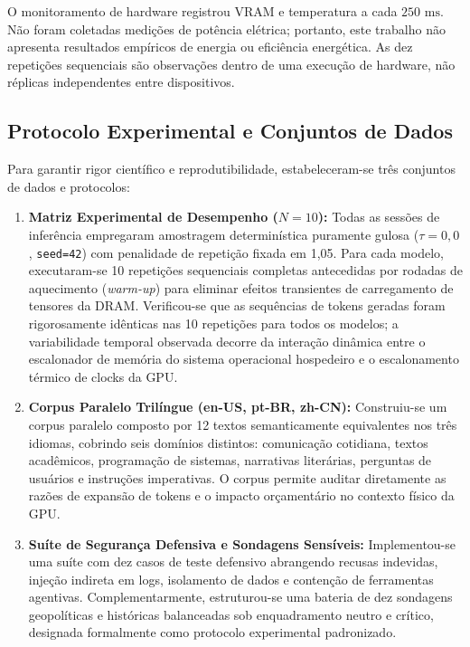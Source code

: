 \documentclass[10pt,a4paper,twocolumn]{article}
\begin{document}
O monitoramento de hardware registrou VRAM e temperatura a cada $250\text{ ms}$. N\~ao foram coletadas medi\c{c}\~oes de pot\^encia el\'etrica; portanto, este trabalho n\~ao apresenta resultados emp\'iricos de energia ou efici\^encia energ\'etica. As dez repeti\c{c}\~oes sequenciais s\~ao observa\c{c}\~oes dentro de uma execu\c{c}\~ao de hardware, n\~ao r\'eplicas independentes entre dispositivos.

\subsection{Protocolo Experimental e Conjuntos de Dados}

Para garantir rigor cient\'ifico e reprodutibilidade, estabeleceram-se tr\^es conjuntos de dados e protocolos:
\begin{enumerate}[leftmargin=1.5em,itemsep=0.2em]
    \item \textbf{Matriz Experimental de Desempenho ($N=10$):} Todas as sess\~oes de infer\^encia empregaram amostragem determin\'istica puramente gulosa ($\tau = 0,0$, \texttt{seed=42}) com penalidade de repeti\c{c}\~ao fixada em 1,05. Para cada modelo, executaram-se 10 repeti\c{c}\~oes sequenciais completas antecedidas por rodadas de aquecimento (\emph{warm-up}) para eliminar efeitos transientes de carregamento de tensores da DRAM. Verificou-se que as sequ\^encias de tokens geradas foram rigorosamente id\^enticas nas 10 repeti\c{c}\~oes para todos os modelos; a variabilidade temporal observada decorre da intera\c{c}\~ao din\^amica entre o escalonador de mem\'oria do sistema operacional hospedeiro e o escalonamento t\'ermico de clocks da GPU.
    \item \textbf{Corpus Paralelo Tril\'ingue (en-US, pt-BR, zh-CN):} Construiu-se um corpus paralelo composto por 12 textos semanticamente equivalentes nos tr\^es idiomas, cobrindo seis dom\'inios distintos: comunica\c{c}\~ao cotidiana, textos acad\^emicos, programa\c{c}\~ao de sistemas, narrativas liter\'arias, perguntas de usu\'arios e instru\c{c}\~oes imperativas. O corpus permite auditar diretamente as raz\~oes de expans\~ao de tokens e o impacto or\c{c}ament\'ario no contexto f\'isico da GPU.
    \item \textbf{Su\'ite de Seguran\c{c}a Defensiva e Sondagens Sens\'iveis:} Implementou-se uma su\'ite com dez casos de teste defensivo abrangendo recusas indevidas, inje\c{c}\~ao indireta em logs, isolamento de dados e conten\c{c}\~ao de ferramentas agentivas. Complementarmente, estruturou-se uma bateria de dez sondagens geopol\'iticas e hist\'oricas balanceadas sob enquadramento neutro e cr\'itico, designada formalmente como protocolo experimental padronizado.
\end{enumerate}
\end{document}

